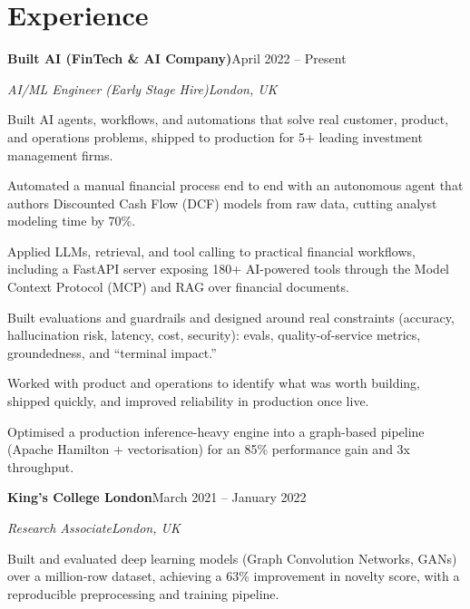 \documentclass[10pt,a4paper]{article}
\newcommand{\entry}[4]{%
  {\color{company}\bfseries #1}\hfill {\color{muted}#2}\par
  \vspace{1pt}
  {\itshape #3}\hfill {\color{muted}\itshape #4}\par
  \vspace{3pt}%
}
\begin{document}
\section{Experience}
\entry{Built AI (FinTech \& AI Company)}{April 2022 -- Present}{AI/ML Engineer (Early Stage Hire)}{London, UK}
\begin{tight}
  \item Built AI agents, workflows, and automations that solve real customer, product, and operations problems, shipped to production for 5+ leading investment management firms.
  \item Automated a manual financial process end to end with an autonomous agent that authors Discounted Cash Flow (DCF) models from raw data, cutting analyst modeling time by 70\%.
  \item Applied LLMs, retrieval, and tool calling to practical financial workflows, including a FastAPI server exposing 180+ AI-powered tools through the Model Context Protocol (MCP) and RAG over financial documents.
  \item Built evaluations and guardrails and designed around real constraints (accuracy, hallucination risk, latency, cost, security): evals, quality-of-service metrics, groundedness, and ``terminal impact.''
  \item Worked with product and operations to identify what was worth building, shipped quickly, and improved reliability in production once live.
  \item Optimised a production inference-heavy engine into a graph-based pipeline (Apache Hamilton + vectorisation) for an 85\% performance gain and 3x throughput.
\end{tight}

\entry{King's College London}{March 2021 -- January 2022}{Research Associate}{London, UK}
\begin{tight}
  \item Built and evaluated deep learning models (Graph Convolution Networks, GANs) over a million-row dataset, achieving a 63\% improvement in novelty score, with a reproducible preprocessing and training pipeline.
\end{tight}

\end{document}
